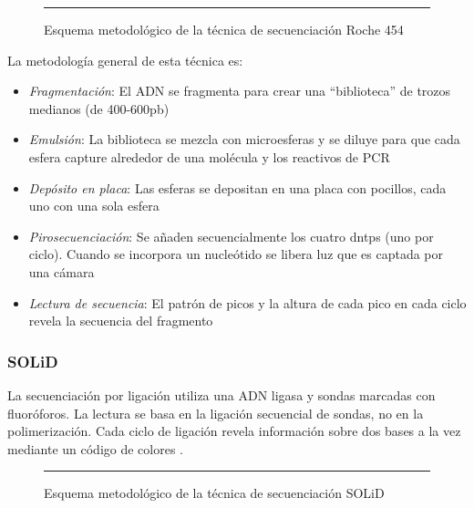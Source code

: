 \documentclass{AsignaturaResumen}
\begin{document}
\begin{figure}\centering
    \resizebox{\linewidth}{!}{}
    \rule{\linewidth}{0.5pt}
    \caption{Esquema metodológico de la técnica de secuenciación Roche 454}
    \label{fig:esquema_secuenciacion_g2_roche}
\end{figure}

La metodología general de esta técnica es:

\begin{itemize}
    \item \emph{Fragmentación}: El ADN se fragmenta para crear una ``biblioteca'' de trozos medianos (de 400-600\acrshort{pb})
    \item \emph{Emulsión}: La biblioteca se mezcla con microesferas y se diluye para que cada esfera capture alrededor de una molécula y los reactivos de PCR
    \item \emph{Depósito en placa}: Las esferas se depositan en una placa con pocillos, cada uno con una sola esfera
    \item \emph{Pirosecuenciación}: Se añaden secuencialmente los cuatro \acrshort{dntps} (uno por ciclo). Cuando se incorpora un nucleótido se libera luz que es captada por una cámara
    \item \emph{Lectura de secuencia}: El patrón de picos y la altura de cada pico en cada ciclo revela la secuencia del fragmento
\end{itemize}

    



\FloatBarrier
\subsubsection{SOLiD}\label{sec:solid}

La secuenciación por ligación utiliza una ADN ligasa y sondas marcadas con fluoróforos. La lectura se basa en la ligación secuencial de sondas, no en la polimerización. Cada ciclo de ligación revela información sobre dos bases a la vez mediante un código de colores \citep{erenDNASequencingMethods2022}.

\begin{figure}\centering
    \resizebox{\linewidth}{!}{}
    \rule{\linewidth}{0.5pt}
    \caption{Esquema metodológico de la técnica de secuenciación SOLiD}
    \label{fig:esquema_secuenciacion_g2_solid}
\end{figure}
\end{document}
